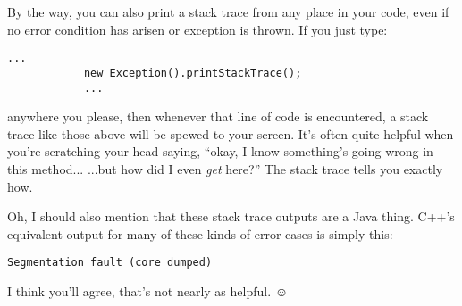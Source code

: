 By the way, you can also print a stack trace from any place in your code, even
if no error condition has arisen or exception is thrown. If you just type:

\begin{Verbatim}[fontsize=\small,samepage=true,frame=single]
            ...
            new Exception().printStackTrace();
            ...
\end{Verbatim}

anywhere you please, then whenever that line of code is encountered, a stack
trace like those above will be spewed to your screen. It's often quite helpful
when you're scratching your head saying, ``okay, I know something's going wrong
in this method... ...but how did I even \textit{get} here?'' The stack trace
tells you exactly how.

\bigskip
{}
Oh, I should also mention that these stack trace outputs are a Java thing.
C++'s equivalent output for many of these kinds of error cases is simply this:

\begin{Verbatim}[fontsize=\small,samepage=true,frame=none]
Segmentation fault (core dumped)
\end{Verbatim}

I think you'll agree, that's not nearly as helpful. $\smiley$
